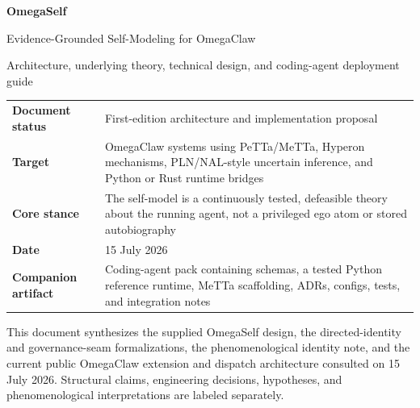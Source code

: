 \documentclass[11pt,oneside]{report}
\begin{document}
\hypersetup{pageanchor=false}

\begin{titlepage}

\vspace*{0.55in}
{\color{white}\Huge\bfseries OmegaSelf\par}
\vspace{0.12in}
{\color{white}\LARGE Evidence-Grounded Self-Modeling for OmegaClaw\par}
\vspace{0.18in}
{\color{white}\large Architecture, underlying theory, technical design, and coding-agent deployment guide\par}

\vspace{2.25in}

\begin{tcolorbox}[colback=OmegaGray,colframe=OmegaBlue,boxrule=0.8pt,arc=2pt]
\begin{tabularx}{\textwidth}{@{}L{1.35in}Y@{}}
\textbf{Document status} & First-edition architecture and implementation proposal \\
\textbf{Target} & OmegaClaw systems using PeTTa/MeTTa, Hyperon mechanisms, PLN/NAL-style uncertain inference, and Python or Rust runtime bridges \\
\textbf{Core stance} & The self-model is a continuously tested, defeasible theory about the running agent, not a privileged ego atom or stored autobiography \\
\textbf{Date} & 15 July 2026 \\
\textbf{Companion artifact} & Coding-agent pack containing schemas, a tested Python reference runtime, MeTTa scaffolding, ADRs, configs, tests, and integration notes \\
\end{tabularx}
\end{tcolorbox}

\vfill
\small
This document synthesizes the supplied OmegaSelf design, the directed-identity and governance-seam formalizations, the phenomenological identity note, and the current public OmegaClaw extension and dispatch architecture consulted on 15 July 2026. Structural claims, engineering decisions, hypotheses, and phenomenological interpretations are labeled separately.
\end{titlepage}
\hypersetup{pageanchor=true}
\end{document}
